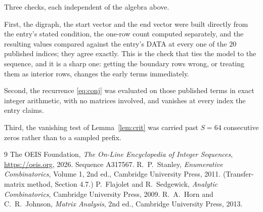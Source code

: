 \documentclass[11pt,a4paper]{article}
\theoremstyle{plain}
\theoremstyle{definition}
\begin{document}
Three checks, each independent of the algebra above.

First, the digraph, the start vector and the end vector were built directly from the
entry's stated condition, the one-row count computed separately, and the resulting values
compared against the entry's DATA at every one of the $20$ published indices; they
agree exactly. This is the check that ties the model to the sequence, and it is a sharp one:
getting the boundary rows wrong, or treating them as interior rows, changes the early terms
immediately.

Second, the recurrence \eqref{eq:conj} was evaluated on those published terms in exact
integer arithmetic, with no matrices involved, and vanishes at every index the entry claims.

Third, the vanishing test of Lemma~\ref{lem:crit} was carried past $S=64$ consecutive
zeros rather than to a sampled prefix.

\begin{thebibliography}{9}
 The OEIS Foundation, \emph{The On-Line Encyclopedia of Integer
Sequences}, \url{https://oeis.org}, 2026. Sequence A317567.
 R.~P.~Stanley, \emph{Enumerative Combinatorics}, Volume 1, 2nd ed.,
Cambridge University Press, 2011. (Transfer-matrix method, Section 4.7.)
 P.~Flajolet and R.~Sedgewick, \emph{Analytic Combinatorics}, Cambridge
University Press, 2009.
 R.~A.~Horn and C.~R.~Johnson, \emph{Matrix Analysis}, 2nd ed., Cambridge
University Press, 2013.
\end{thebibliography}
\end{document}
